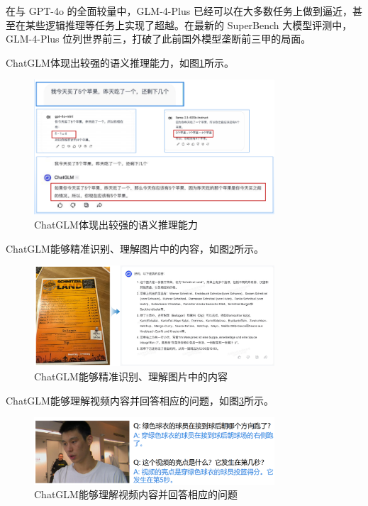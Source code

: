 在与 GPT-4o 的全面较量中，GLM-4-Plus 已经可以在大多数任务上做到逼近，甚至在某些逻辑推理等任务上实现了超越。在最新的 SuperBench 大模型评测中，GLM-4-Plus 位列世界前三，打破了此前国外模型垄断前三甲的局面。


ChatGLM体现出较强的语义推理能力，如图\ref{fig:chatglm}所示。

\begin{figure}[H]
	\centering
	\includegraphics[width=0.8\textwidth]{figures/chapter1/fig3.png}
	\caption{ChatGLM体现出较强的语义推理能力}
	\label{fig:chatglm}
\end{figure}


ChatGLM能够精准识别、理解图片中的内容，如图\ref{fig:chatglm2}所示。

\begin{figure}[H]
	\centering
	\includegraphics[width=0.8\textwidth]{figures/chapter1/fig4.png}
	\caption{ChatGLM能够精准识别、理解图片中的内容}
	\label{fig:chatglm2}
\end{figure}


ChatGLM能够理解视频内容并回答相应的问题，如图\ref{fig:chatglm3}所示。

\begin{figure}[H]
	\centering
	\includegraphics[width=0.8\textwidth]{figures/chapter1/fig5.png}
	\caption{ChatGLM能够理解视频内容并回答相应的问题}
	\label{fig:chatglm3}
\end{figure}



